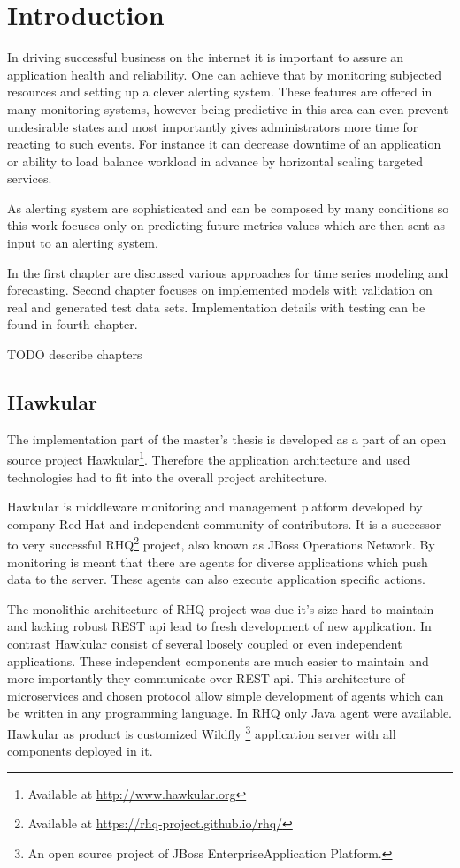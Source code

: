 
\chapter{Introduction}
In driving successful business on the internet it is important to assure an application
health and reliability. One can achieve that by monitoring subjected resources and setting
up a clever alerting system. These features are offered in many monitoring systems, however 
being predictive in this area can even prevent undesirable states and most importantly gives administrators more time for
reacting to such events. For instance it can decrease downtime of an application 
or ability to load balance workload in advance by horizontal scaling targeted services. 

As alerting system are sophisticated and can be composed by many conditions so this work
focuses only on predicting future metrics values which are then sent as input to an alerting system. 

In the first chapter are discussed various approaches for time series modeling and
forecasting. Second chapter focuses on implemented models with validation on real and 
generated test data sets. Implementation details with testing can be found in fourth chapter.

TODO describe chapters

    \section{Hawkular}
    The implementation part of the master's thesis is developed as a part of an open source project
    Hawkular\footnote{Available at \url{http://www.hawkular.org}}. 
    Therefore the application architecture and used technologies had to fit 
    into the overall project architecture.

    Hawkular is middleware monitoring and management platform
    developed by company Red Hat and independent community of contributors.
    It is a successor to very successful RHQ\footnote{Available at \url{https://rhq-project.github.io/rhq/}} 
    project, also known as JBoss Operations Network.
    By monitoring is meant that there are agents for diverse applications which
    push data to the server. These agents can also execute application specific actions. 

    The monolithic architecture of RHQ project was due it's size hard to maintain 
    and lacking robust REST api lead to fresh development of new application.   
    In contrast Hawkular consist of several loosely coupled or even independent applications.
    These independent components are much
    easier to maintain and more importantly they communicate over REST api. This
    architecture of microservices and chosen protocol allow simple development of 
    agents which can be written in any programming language. In RHQ only Java agent were
    available. Hawkular as product is customized Wildfly
    \footnote{An open source project of JBoss EnterpriseApplication Platform.}
    application server with all components deployed in it.

